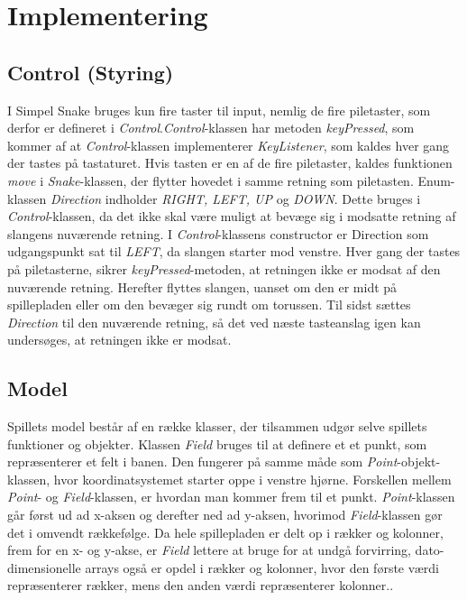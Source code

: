 \section{Implementering}
\subsection{Control (Styring)}
I Simpel Snake bruges kun fire taster til input, nemlig de fire piletaster, som derfor er defineret i \textit{Control}.\textit{Control}-klassen har metoden \textit{keyPressed}, som kommer af at \textit{Control}-klassen implementerer \textit{KeyListener}, som kaldes hver gang der tastes på tastaturet. Hvis tasten er en af de fire piletaster, kaldes funktionen \textit{move} i \textit{Snake}-klassen, der flytter hovedet i samme retning som piletasten.
Enum-klassen \textit{Direction} indholder \textit{RIGHT, LEFT, UP} og \textit{DOWN}. Dette bruges i \textit{Control}-klassen, da det ikke skal være muligt at bevæge sig i modsatte retning af slangens nuværende retning.
I \textit{Control}-klassens constructor er Direction som udgangspunkt sat til \textit{LEFT}, da slangen starter mod venstre. Hver gang der tastes på piletasterne, sikrer \textit{keyPressed}-metoden, at retningen ikke er modsat af den nuværende retning. Herefter flyttes slangen, uanset om den er midt på spillepladen eller om den bevæger sig rundt om torussen. Til sidst sættes \textit{Direction} til den nuværende retning, så det ved næste tasteanslag igen kan undersøges, at retningen ikke er modsat.

\subsection{Model}
Spillets model består af en række klasser, der tilsammen udgør selve spillets funktioner og objekter.
Klassen \textit{Field} bruges til at definere et et punkt, som repræsenterer et felt i banen. Den fungerer på samme måde som \textit{Point}-objekt-klassen, hvor koordinatsystemet starter oppe i venstre hjørne. Forskellen mellem \textit{Point}- og \textit{Field}-klassen, er hvordan man kommer frem til et punkt. \textit{Point}-klassen går først ud ad x-aksen og derefter ned ad y-aksen, hvorimod \textit{Field}-klassen gør det i omvendt rækkefølge. Da hele spillepladen er delt op i rækker og kolonner, frem for en x- og y-akse, er \textit{Field} lettere at bruge for at undgå forvirring, dato-dimensionelle arrays også er opdel i rækker og kolonner, hvor den første værdi repræsenterer rækker, mens den anden værdi repræsenterer kolonner..

